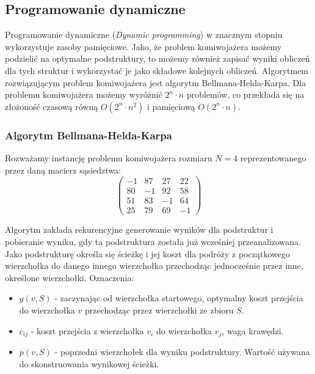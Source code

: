 \documentclass[12pt]{article}
\begin{document}
\subsection{Programowanie dynamiczne}
Programowanie dynamiczne (\textit{Dynamic programming}) w znacznym stopniu wykorzystuje zasoby pamięciowe. Jako, że problem komiwojażera możemy podzielić na optymalne podstruktury, to możemy również zapisać wyniki obliczeń dla tych struktur i wykorzystać je jako składowe kolejnych obliczeń. Algorytmem rozwiązującym problem komiwojażera jest algorytm Bellmana-Helda-Karpa. Dla problemu komiwojażera możemy wyróżnić $2^n \cdot n$ problemów, co przekłada się na złożoność czasową równą $O(2^n \cdot n^2)$ i pamięciową $O(2^n \cdot n)$.

\subsubsection{Algorytm Bellmana-Helda-Karpa}
Rozważamy instancję problemu komiwojażera rozmiaru $N=4$ reprezentowanego przez daną macierz sąsiedztwa:
$$
    \begin{pmatrix}
        -1 & 87 & 27 & 22 \\
        80 & -1 & 92 & 58 \\
        51 & 83 & -1 & 64 \\
        25 & 79 & 69 & -1
    \end{pmatrix}
$$

Algorytm zakłada rekurencyjne generowanie wyników dla podstruktur i pobieranie wyniku, gdy ta podstruktura została już wcześniej przeanalizowana. Jako podstrukturę określa się ścieżkę i jej koszt dla podróży z początkowego wierzchołka do danego innego wierzchołka przechodząc jednocześnie przez inne, określone wierzchołki. Oznaczenia:
\begin{itemize}
    \item $g(v, S)$ - zaczynając od wierzchołka startowego, optymalny koszt przejścia do wierzchołka $v$ przechodząc przez wierzchołki ze zbioru $S$.
    \item $c_{ij}$ - koszt przejścia z wierzchołka $v_i$ do wierzchołka $v_j$, waga krawędzi.
    \item $p(v, S)$ - poprzedni wierzchołek dla wyniku podstruktury. Wartość używana do skonstruowania wynikowej ścieżki.
\end{itemize}
\end{document}
